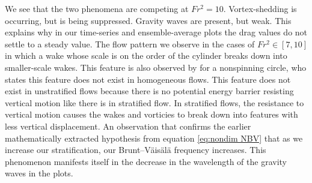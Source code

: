We see that the two phenomena are competing at $Fr^2 = 10$. Vortex-shedding is occurring, but is being suppressed. Gravity waves are present, but weak. This explains why in our time-series and ensemble-average plots the drag values do not settle to a steady value.
The flow pattern we observe in the cases of $Fr^2 \in [7, 10]$ in which a wake whose scale is on the order of the cylinder breaks down into smaller-scale wakes. This feature is also observed by \cite{deng_drag_2022} for a nonspinning circle, who states this feature does not exist in homogeneous flows. This feature does not exist in unstratified flows because there is no potential energy barrier resisting vertical motion like there is in stratified flow. In stratified flows, the resistance to vertical motion causes the wakes and vorticies to break down into features with less vertical displacement. An observation that confirms the earlier mathematically extracted hypothesis from equation \ref{eq:nondim NBV} that as we increase our stratification, our Brunt–Väisälä frequency increases. This phenomenon manifests itself in the decrease in the wavelength of the gravity waves in the plots.


